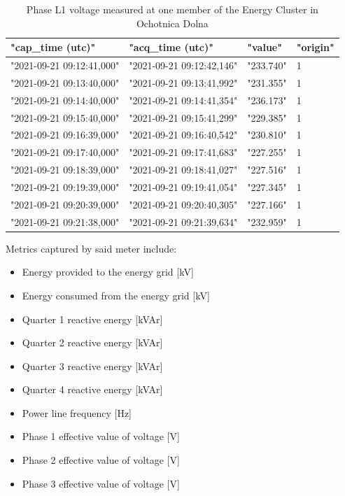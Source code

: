 \begin{table}[!ht]
    \centering
    \caption{Phase L1 voltage measured at one member of the Energy Cluster in Ochotnica Dolna \citep{ochotnica}}
    \begin{tabular}{llll}
    \hline
        "cap\_time (utc)" & "acq\_time (utc)" & "value" & "origin" \\ \hline
        "2021-09-21 09:12:41,000" & "2021-09-21 09:12:42,146" & "233.740" & 1 \\ 
        "2021-09-21 09:13:40,000" & "2021-09-21 09:13:41,992" & "231.355" & 1 \\ 
        "2021-09-21 09:14:40,000" & "2021-09-21 09:14:41,354" & "236.173" & 1 \\ 
        "2021-09-21 09:15:40,000" & "2021-09-21 09:15:41,299" & "229.385" & 1 \\ 
        "2021-09-21 09:16:39,000" & "2021-09-21 09:16:40,542" & "230.810" & 1 \\ 
        "2021-09-21 09:17:40,000" & "2021-09-21 09:17:41,683" & "227.255" & 1 \\ 
        "2021-09-21 09:18:39,000" & "2021-09-21 09:18:41,027" & "227.516" & 1 \\ 
        "2021-09-21 09:19:39,000" & "2021-09-21 09:19:41,054" & "227.345" & 1 \\ 
        "2021-09-21 09:20:39,000" & "2021-09-21 09:20:40,305" & "227.166" & 1 \\ 
        "2021-09-21 09:21:38,000" & "2021-09-21 09:21:39,634" & "232.959" & 1 \\ \hline
    \end{tabular}
\end{table}

\par Metrics captured by said meter include:
\begin{itemize}
  \item Energy provided to the energy grid [kV]
  \item Energy consumed from the energy grid [kV]
  \item Quarter 1 reactive energy [kVAr]
  \item Quarter 2 reactive energy [kVAr]
  \item Quarter 3 reactive energy [kVAr]
  \item Quarter 4 reactive energy [kVAr]
  \item Power line frequency [Hz]
  \item Phase 1 effective value of voltage [V]
  \item Phase 2 effective value of voltage [V]
  \item Phase 3 effective value of voltage [V]
\end{itemize}